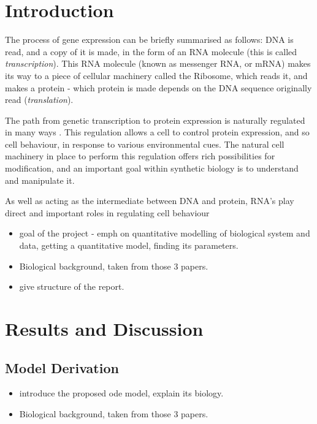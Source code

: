 \documentclass[11pt,journal]{./IEEE_latex_class/IEEEtran}
\begin{document}
\IEEEpeerreviewmaketitle


\section{Introduction}
\label{sec: Intro}
The process of gene expression can be briefly summarised as follows: DNA is read, and a copy of it is made, in the form of an RNA molecule (this is called \textit{transcription}). This RNA molecule (known as messenger RNA, or mRNA) makes its way to a piece of cellular machinery called the Ribosome, which reads it, and makes a protein - which protein is made depends on the DNA sequence originally read (\textit{translation}).  

 The path from genetic transcription to protein expression is naturally regulated in many ways \cite{MolecularBiology}. This regulation allows a cell to control protein expression, and so cell behaviour, in response to various environmental cues. The natural cell machinery in place to perform this regulation offers rich possibilities for modification, and an important goal within synthetic biology is to understand and manipulate it.

As well as acting as the intermediate between DNA and protein, RNA's play direct and important roles in regulating cell behaviour \cite{Isaacs2006}


 \begin{itemize}
 \item goal of the project - emph on quantitative modelling of biological system and data, getting a quantitative model, finding its parameters.
 \item Biological background, taken from those 3 papers.
 \item give structure of the report.
 \end{itemize}

\section{Results and Discussion}
\label{Results and Discussion}



\subsection{Model Derivation}

 \begin{itemize}
 \item introduce the proposed ode model, explain its biology.
 \item Biological background, taken from those 3 papers.
 \end{itemize}
\end{document}
